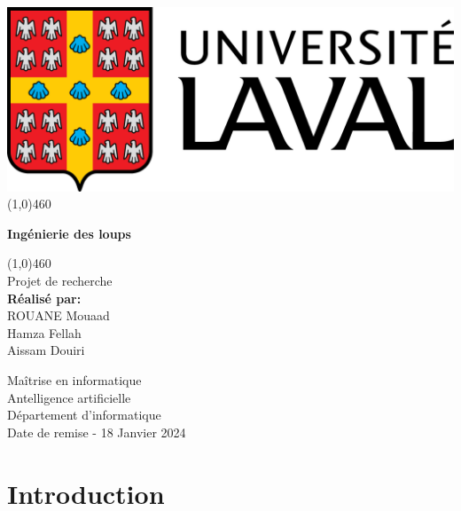 \documentclass{article}
\begin{document}
\begin{titlepage}
  \begin{center}
  \includegraphics[scale=0.15]{Figures/ULaval.png}
  \line(1,0){460}\\
  
  \begin{large}
  \Large{\textbf{Ingénierie des loups}}
  \\
  \end{large}
  \line(1,0){460}\\
  [1.5cm]
  \Large{Projet de recherche}\\ 
  [1.5cm]
  \Large{\textbf{Réalisé par:}}\\
  ROUANE Mouaad \\ Hamza Fellah \\ Aissam Douiri
  
  \vspace{1cm}
  \Large{Maîtrise en informatique}\\
  Antelligence artificielle \\
  [5cm]
  Département d'informatique\\
  Date de remise - 18 Janvier 2024
  \end{center} 
  \end{titlepage}

\newpage
  \tableofcontents
\newpage

\thispagestyle{plain}


\section{Introduction}
\end{document}
